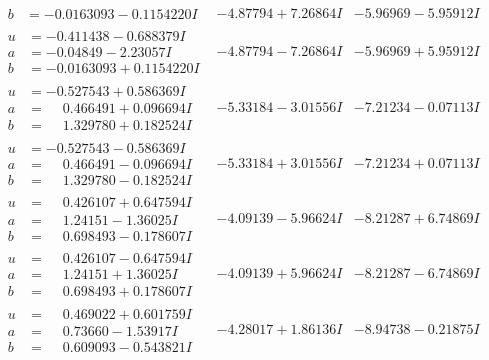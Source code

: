 \documentclass[1p]{elsarticle_modified}
\theoremstyle{definition}
\begin{document}
$$\begin{array}{c|c|c}
\begin{aligned}
b &= -0.0163093 - 0.1154220 I\end{aligned}
 & -4.87794 + 7.26864 I & -5.96969 - 5.95912 I \\ \hline\begin{aligned}
u &= -0.411438 - 0.688379 I \\
a &= -0.04849 - 2.23057 I \\
b &= -0.0163093 + 0.1154220 I\end{aligned}
 & -4.87794 - 7.26864 I & -5.96969 + 5.95912 I \\ \hline\begin{aligned}
u &= -0.527543 + 0.586369 I \\
a &= \phantom{-}0.466491 + 0.096694 I \\
b &= \phantom{-}1.329780 + 0.182524 I\end{aligned}
 & -5.33184 - 3.01556 I & -7.21234 - 0.07113 I \\ \hline\begin{aligned}
u &= -0.527543 - 0.586369 I \\
a &= \phantom{-}0.466491 - 0.096694 I \\
b &= \phantom{-}1.329780 - 0.182524 I\end{aligned}
 & -5.33184 + 3.01556 I & -7.21234 + 0.07113 I \\ \hline\begin{aligned}
u &= \phantom{-}0.426107 + 0.647594 I \\
a &= \phantom{-}1.24151 - 1.36025 I \\
b &= \phantom{-}0.698493 - 0.178607 I\end{aligned}
 & -4.09139 - 5.96624 I & -8.21287 + 6.74869 I \\ \hline\begin{aligned}
u &= \phantom{-}0.426107 - 0.647594 I \\
a &= \phantom{-}1.24151 + 1.36025 I \\
b &= \phantom{-}0.698493 + 0.178607 I\end{aligned}
 & -4.09139 + 5.96624 I & -8.21287 - 6.74869 I \\ \hline\begin{aligned}
u &= \phantom{-}0.469022 + 0.601759 I \\
a &= \phantom{-}0.73660 - 1.53917 I \\
b &= \phantom{-}0.609093 - 0.543821 I\end{aligned}
 & -4.28017 + 1.86136 I & -8.94738 - 0.21875 I \\ \hline\begin{aligned}

\end{aligned}
\end{array}$$
\end{document}
